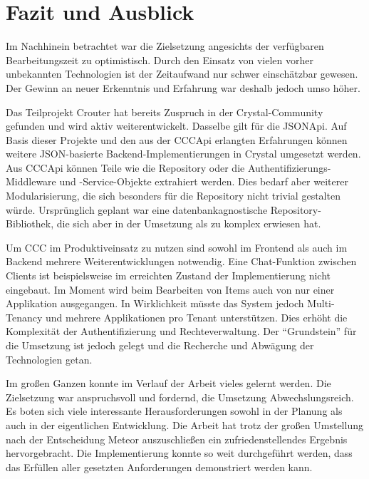 \section{Fazit und Ausblick}
\label{sec:d_fazit_und_ausblick}

Im Nachhinein betrachtet war die Zielsetzung angesichts der verfügbaren
Bearbeitungszeit zu optimistisch.  Durch den Einsatz von vielen vorher
unbekannten Technologien ist der Zeitaufwand nur schwer einschätzbar gewesen.
Der Gewinn an neuer Erkenntnis und Erfahrung war deshalb jedoch umso höher.

Das Teilprojekt Crouter hat bereits Zuspruch in der Crystal-Community gefunden
und wird aktiv weiterentwickelt.  Dasselbe gilt für die JSONApi.  Auf Basis
dieser Projekte und den aus der CCCApi erlangten Erfahrungen können weitere
JSON-basierte Backend-Implementierungen in Crystal umgesetzt werden.  Aus
CCCApi können Teile wie die Repository oder die Authentifizierungs-Middleware
und -Service-Objekte extrahiert werden.  Dies bedarf aber weiterer
Modularisierung, die sich besonders für die Repository nicht trivial gestalten
würde.  Ursprünglich geplant war eine datenbankagnostische
Repository-Bibliothek, die sich aber in der Umsetzung als zu komplex erwiesen
hat.

Um CCC im Produktiveinsatz zu nutzen sind sowohl im Frontend als auch im Backend
mehrere Weiterentwicklungen notwendig.  Eine Chat-Funktion zwischen Clients ist
beispielsweise im erreichten Zustand der Implementierung nicht eingebaut.  Im
Moment wird beim Bearbeiten von Items auch von nur einer Applikation
ausgegangen.  In Wirklichkeit müsste das System jedoch Multi-Tenancy
und mehrere Applikationen pro Tenant unterstützen.  Dies erhöht die Komplexität
der Authentifizierung und Rechteverwaltung.  Der \enquote{Grundstein} für die
Umsetzung ist jedoch gelegt und die Recherche und Abwägung der Technologien
getan.

Im großen Ganzen konnte im Verlauf der Arbeit vieles gelernt werden.  Die
Zielsetzung war anspruchsvoll und fordernd, die Umsetzung Abwechslungsreich.
Es boten sich viele interessante Herausforderungen sowohl in der Planung als
auch in der eigentlichen Entwicklung. Die Arbeit hat trotz der großen
Umstellung nach der Entscheidung Meteor auszuschließen ein zufriedenstellendes
Ergebnis hervorgebracht.  Die Implementierung konnte so weit durchgeführt
werden, dass das Erfüllen aller gesetzten Anforderungen demonstriert werden
kann.
